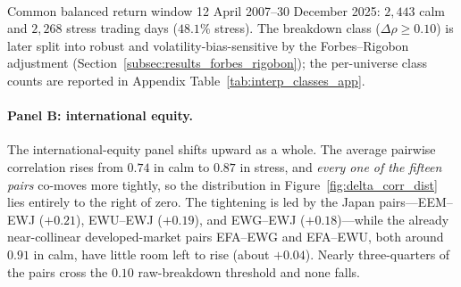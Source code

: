 \begin{table}[htbp]
\centering
\caption{Regime-conditional correlation summary by universe, on the common balanced window. $\overline{\rho}^{\,\mathrm{calm}}$ and $\overline{\rho}^{\,\mathrm{stress}}$ are the mean pairwise Pearson correlations (Equation~\eqref{eq:regime_corr}) in each regime; $\overline{\Delta\rho}$ and the median summarize the stress-minus-calm change (Equation~\eqref{eq:corr_delta}). The last three columns give the share of pairs that are \emph{resilient} ($\Delta\rho < 0$), a \emph{small increase} ($0 \le \Delta\rho < 0.10$), or a raw \emph{breakdown} ($\Delta\rho \ge 0.10$).}
\label{tab:corr_summary}
\\[0.4em]
{\footnotesize Common balanced return window 12 April 2007--30 December 2025: $2{,}443$ calm and $2{,}268$ stress trading days ($48.1\%$ stress). The breakdown class ($\Delta\rho \ge 0.10$) is later split into robust and volatility-bias-sensitive by the Forbes--Rigobon adjustment (Section~\ref{subsec:results_forbes_rigobon}); the per-universe class counts are reported in Appendix Table~\ref{tab:interp_classes_app}.}
\end{table}

\paragraph{Panel B: international equity.} The international-equity panel shifts upward as a whole. The average pairwise correlation rises from $0.74$ in calm to $0.87$ in stress, and \emph{every one of the fifteen pairs} co-moves more tightly, so the distribution in Figure~\ref{fig:delta_corr_dist} lies entirely to the right of zero. The tightening is led by the Japan pairs---EEM--EWJ ($+0.21$), EWU--EWJ ($+0.19$), and EWG--EWJ ($+0.18$)---while the already near-collinear developed-market pairs EFA--EWG and EFA--EWU, both around $0.91$ in calm, have little room left to rise (about $+0.04$). Nearly three-quarters of the pairs cross the $0.10$ raw-breakdown threshold and none falls.

